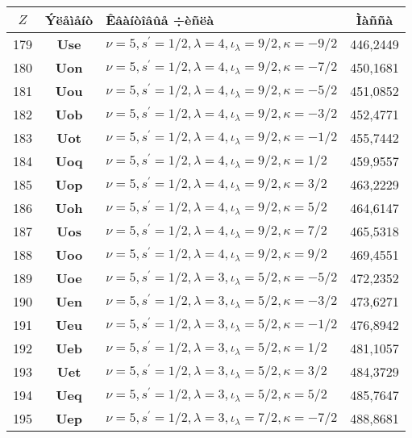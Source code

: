 \begin{center}
{\renewcommand{\arraystretch}{1.0}
\begin{tabular}{|c|c|l|c|}\hline
$Z$ & Ýëåìåíò     & Êâàíòîâûå ÷èñëà & Ìàññà  \\ \hline\hline
179 & \textbf{Use}& $\nu=5,s^\prime=1/2,\lambda=4,\iota_\lambda=9/2,\kappa=-9/2$ &  446,2449\\
180 & \textbf{Uon}& $\nu=5,s^\prime=1/2,\lambda=4,\iota_\lambda=9/2,\kappa=-7/2$ &  450,1681\\
181 & \textbf{Uou}& $\nu=5,s^\prime=1/2,\lambda=4,\iota_\lambda=9/2,\kappa=-5/2$ &  451,0852\\
182 & \textbf{Uob}& $\nu=5,s^\prime=1/2,\lambda=4,\iota_\lambda=9/2,\kappa=-3/2$ &  452,4771\\
183 & \textbf{Uot}& $\nu=5,s^\prime=1/2,\lambda=4,\iota_\lambda=9/2,\kappa=-1/2$ &  455,7442\\
184 & \textbf{Uoq}& $\nu=5,s^\prime=1/2,\lambda=4,\iota_\lambda=9/2,\kappa=1/2$ &  459,9557\\
185 & \textbf{Uop}& $\nu=5,s^\prime=1/2,\lambda=4,\iota_\lambda=9/2,\kappa=3/2$ &  463,2229\\
186 & \textbf{Uoh}& $\nu=5,s^\prime=1/2,\lambda=4,\iota_\lambda=9/2,\kappa=5/2$ &  464,6147\\
187 & \textbf{Uos}& $\nu=5,s^\prime=1/2,\lambda=4,\iota_\lambda=9/2,\kappa=7/2$ &  465,5318\\
188 & \textbf{Uoo}& $\nu=5,s^\prime=1/2,\lambda=4,\iota_\lambda=9/2,\kappa=9/2$ &  469,4551\\
\hline
189 & \textbf{Uoe}& $\nu=5,s^\prime=1/2,\lambda=3,\iota_\lambda=5/2,\kappa=-5/2$ &  472,2352\\
190 & \textbf{Uen}& $\nu=5,s^\prime=1/2,\lambda=3,\iota_\lambda=5/2,\kappa=-3/2$ &  473,6271\\
191 & \textbf{Ueu}& $\nu=5,s^\prime=1/2,\lambda=3,\iota_\lambda=5/2,\kappa=-1/2$ &  476,8942\\
192 & \textbf{Ueb}& $\nu=5,s^\prime=1/2,\lambda=3,\iota_\lambda=5/2,\kappa=1/2$ &  481,1057\\
193 & \textbf{Uet}& $\nu=5,s^\prime=1/2,\lambda=3,\iota_\lambda=5/2,\kappa=3/2$ &  484,3729\\
194 & \textbf{Ueq}& $\nu=5,s^\prime=1/2,\lambda=3,\iota_\lambda=5/2,\kappa=5/2$ &  485,7647\\
\hline
195 & \textbf{Uep}& $\nu=5,s^\prime=1/2,\lambda=3,\iota_\lambda=7/2,\kappa=-7/2$ &  488,8681\\

\end{tabular}}
\end{center}

